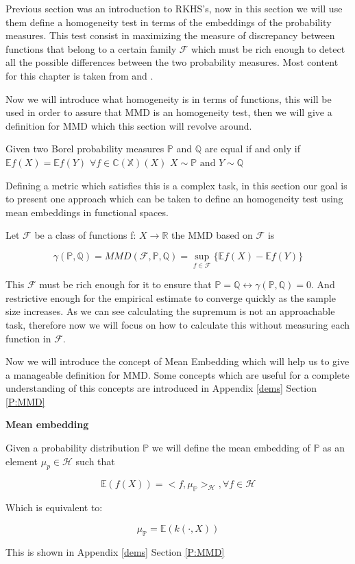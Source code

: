 Previous section was an introduction to RKHS's, now in this section we will use them define a homogeneity test in terms of the embeddings of the probability measures. This test consist in maximizing the measure of discrepancy between functions that belong to a certain family $\mathcal{F}$ which must be rich enough to detect all the possible differences between the two probability measures. Most content for this chapter is taken from \cite{MMD1} and \cite{MMD2}.

Now we will introduce what homogeneity is in terms of functions, this will be used in order to assure that MMD is an homogeneity test, then we will give a definition for MMD which this section will revolve around.
\begin{lem}[Homogeneity]
Given two Borel probability measures $\mathbb{P}$ and $\mathbb{Q}$  are equal if and only if $\mathbb{E}f(X) = \mathbb{E}f(Y)$  $\forall f \in \mathbb{C(X)}(X)$
$X \sim \mathbb{P} \text{ and } Y \sim \mathbb{Q}$
\end{lem}
Defining a metric which satisfies this is a complex task, in this section our goal is to present one approach which can be taken to define an homogeneity test using mean embeddings in functional spaces. 

Let $\mathcal{F}$ be a class of functions f: $X \rightarrow \mathbb{R}$ the MMD based on $\mathcal{F}$ is

$$\gamma(\mathbb{P},\mathbb{Q}) = MMD(\mathcal{F},\mathbb{P},\mathbb{Q}) =  \sup\limits_{f\in\mathcal{F}}\{\mathbb{E}f(X) -\mathbb{E}f(Y)\}$$

This $\mathcal{F}$ must be rich enough for it to ensure that $\mathbb{P} = \mathbb{Q} \leftrightarrow \gamma(\mathbb{P},\mathbb{Q}) = 0$. And restrictive enough for the empirical estimate to converge quickly as the sample size increases. As we can see calculating the supremum is not an approachable task, therefore now we will focus on how to calculate this without measuring each function in $\mathcal{F}$.

Now we will introduce the concept of Mean Embedding which will help us to give a manageable definition for MMD. Some concepts which are useful for a complete understanding of this concepts are introduced in Appendix \ref{dems} Section \ref{P:MMD}

\begin{defn}[D:ME]
\textsf{\textbf{Mean embedding}}

Given a probability distribution $\mathbb{P}$ we will define the mean embedding of $\mathbb{P}$ as an element $\mu_{p} \in \mathcal{H}$ such that

$$\mathbb{E}(f(X))=<f,\mu_{\mathbb{P}}>_{\mathcal{H}}, \forall f \in \mathcal{H}$$

Which is equivalent to:

$$\mu_{\mathbb{P}} = \mathbb{E}(k(\cdot,X))$$

This is shown in Appendix \ref{dems} Section \ref{P:MMD}
\end{defn}

